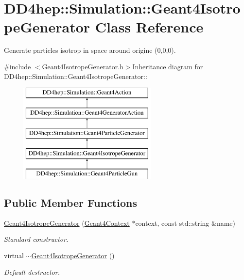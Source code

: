 \hypertarget{class_d_d4hep_1_1_simulation_1_1_geant4_isotrope_generator}{
\section{DD4hep::Simulation::Geant4IsotropeGenerator Class Reference}
\label{class_d_d4hep_1_1_simulation_1_1_geant4_isotrope_generator}
}


Generate particles isotrop in space around origine (0,0,0).  


{\ttfamily \#include $<$Geant4IsotropeGenerator.h$>$}Inheritance diagram for DD4hep::Simulation::Geant4IsotropeGenerator::\begin{figure}[H]
\begin{center}
\leavevmode
\includegraphics[height=5cm]{class_d_d4hep_1_1_simulation_1_1_geant4_isotrope_generator}
\end{center}
\end{figure}
\subsection*{Public Member Functions}
\begin{DoxyCompactItemize}
\item 
\hyperlink{class_d_d4hep_1_1_simulation_1_1_geant4_isotrope_generator_a5db218a6abf4aa629528357a42bc530a}{Geant4IsotropeGenerator} (\hyperlink{class_d_d4hep_1_1_simulation_1_1_geant4_context}{Geant4Context} $\ast$context, const std::string \&name)
\begin{DoxyCompactList}\small\item\em Standard constructor. \item\end{DoxyCompactList}\item 
virtual \hyperlink{class_d_d4hep_1_1_simulation_1_1_geant4_isotrope_generator_a0c8cc2163617f319fd3b58a11b3e64ea}{$\sim$Geant4IsotropeGenerator} ()
\begin{DoxyCompactList}\small\item\em Default destructor. \item\end{DoxyCompactList}\end{DoxyCompactItemize}
